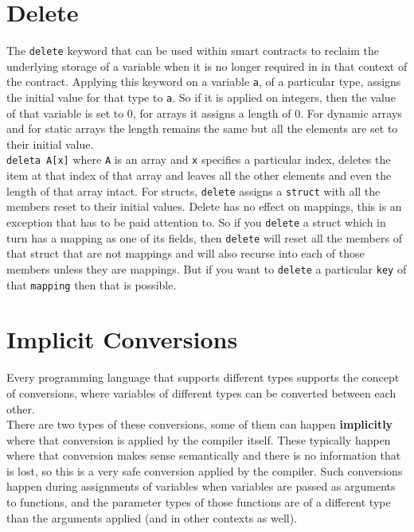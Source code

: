 \section{Delete}
The \texttt{delete} keyword that can be used within smart contracts to reclaim the underlying storage of a variable when it is no longer required in in that context of the contract. Applying this keyword on a variable \texttt{a}, of a particular type, assigns the initial value for that type to \texttt{a}. So if it is applied on integers, then the value of that variable is set to 0, for arrays it assigns a length of 0. For dynamic arrays and for static arrays the length remains the same but all the elements are set to their initial value.\\

\texttt{deleta A[x]} where \texttt{A} is an array and \texttt{x} specifies a particular index, deletes the item at that index of that array and leaves all the other elements and even the length of that array intact. For structs, \texttt{delete} assigns a \texttt{struct} with all the members reset to their initial values. Delete has no effect on mappings, this is an exception that has to be paid attention to. So if you \texttt{delete} a struct which in turn has a mapping as one of its fields, then \texttt{delete} will reset all the members of that struct that are not mappings and will also recurse into each of those members unless they are mappings. But if you want to \texttt{delete} a particular \texttt{key} of that \texttt{mapping} then that is possible.\\

\section{Implicit Conversions}
Every programming language that supports different types supports the concept of conversions, where variables of different types can be converted between each other.\\

There are two types of these conversions, some of them can happen \textbf{implicitly} where that conversion is applied by the compiler itself. These typically happen where that conversion makes sense semantically and there is no information that is lost, so this is a very safe conversion applied by the compiler. Such conversions happen during assignments of variables when variables are passed as arguments to functions, and the parameter types of those functions are of a different type than the arguments applied (and in other contexts as well).\\ 


